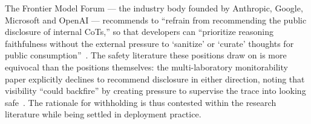 \documentclass[manuscript,review,anonymous]{acmart}
\newcommand{\todolist}[1]{%
  \noindent\textcolor{colortodo}{\rule{\linewidth}{0.2pt}}\\[0.2em]%
  \noindent\textcolor{colortodo}{\faWrench~\textbf{TODO:} #1} \\
  \noindent\textcolor{colortodo}{\rule{\linewidth}{0.2pt}}\\
}
\begin{document}








The Frontier
Model Forum --- the industry body founded by Anthropic, Google, Microsoft and
OpenAI --- recommends to ``refrain from recommending the public
disclosure of internal CoTs,'' so that developers can ``prioritize reasoning
faithfulness without the external pressure to `sanitize' or `curate' thoughts for
public consumption''~\cite{fmf2026cot}. The safety literature these positions
draw on is more equivocal than the positions themselves: the multi-laboratory
monitorability paper explicitly declines to recommend disclosure in either
direction, noting that visibility ``could backfire'' by creating pressure to
supervise the trace into looking safe~\cite{korbak2025monitorability}. The
rationale for withholding is thus contested within the research literature while
being settled in deployment practice.
\end{document}
